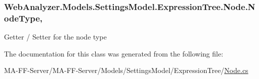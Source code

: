 \hypertarget{class_web_analyzer_1_1_models_1_1_settings_model_1_1_expression_tree_1_1_node_a326bab10d73a525224fcf5b061491dda}{}
\subsubsection[{Node\+Type}]{ Web\+Analyzer.\+Models.\+Settings\+Model.\+Expression\+Tree.\+Node.\+Node\+Type\hspace{0.3cm}{\ttfamily [get]}, {\ttfamily [set]}}\label{class_web_analyzer_1_1_models_1_1_settings_model_1_1_expression_tree_1_1_node_a326bab10d73a525224fcf5b061491dda}


Getter / Setter for the node type 



The documentation for this class was generated from the following file\+:\begin{DoxyCompactItemize}
\item 
M\+A-\/\+F\+F-\/\+Server/\+M\+A-\/\+F\+F-\/\+Server/\+Models/\+Settings\+Model/\+Expression\+Tree/\hyperlink{_node_8cs}{Node.\+cs}\end{DoxyCompactItemize}
